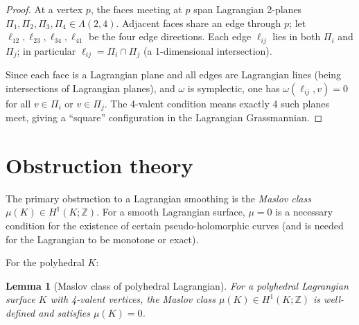 \documentclass[12pt]{article}
\newtheorem{lemma}[theorem]{Lemma}
\begin{document}
\begin{proof}
At a vertex $p$, the faces meeting at $p$ span Lagrangian 2-planes $\Pi_1, \Pi_2, \Pi_3, \Pi_4 \in \Lambda(2,4)$.  Adjacent faces share an edge through $p$; let $\ell_{12}, \ell_{23}, \ell_{34}, \ell_{41}$ be the four edge directions.  Each edge $\ell_{ij}$ lies in both $\Pi_i$ and $\Pi_{j}$; in particular $\ell_{ij} = \Pi_i\cap\Pi_j$ (a 1-dimensional intersection).

Since each face is a Lagrangian plane and all edges are Lagrangian lines (being intersections of Lagrangian planes), and $\omega$ is symplectic, one has $\omega(\ell_{ij}, v) = 0$ for all $v \in \Pi_i$ or $v\in\Pi_j$.  The 4-valent condition means exactly 4 such planes meet, giving a ``square'' configuration in the Lagrangian Grassmannian.
\end{proof}

\section*{Obstruction theory}

The primary obstruction to a Lagrangian smoothing is the \emph{Maslov class} $\mu(K) \in H^1(K;\mathbb{Z})$.  For a smooth Lagrangian surface, $\mu = 0$ is a necessary condition for the existence of certain pseudo-holomorphic curves (and is needed for the Lagrangian to be monotone or exact).

For the polyhedral $K$:
\begin{lemma}[Maslov class of polyhedral Lagrangian]
  \label{lem:maslov}
  For a polyhedral Lagrangian surface $K$ with 4-valent vertices, the Maslov class $\mu(K)\in H^1(K;\mathbb{Z})$ is well-defined and satisfies $\mu(K) = 0$.
\end{lemma}
\end{document}
